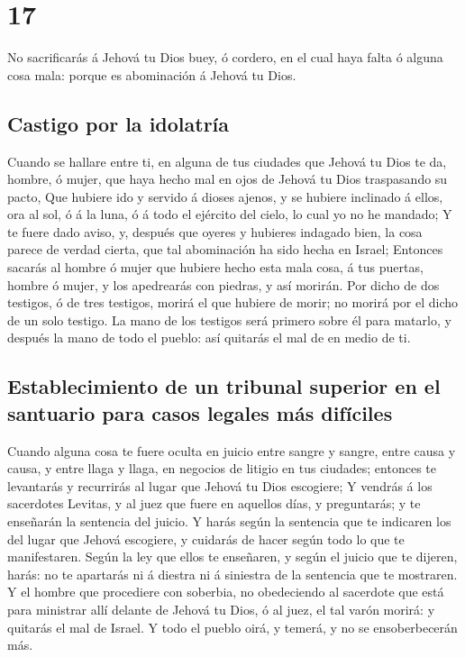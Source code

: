 \hypertarget{section-16}{%
\section{17}\label{section-16}}

 No sacrificarás á Jehová tu Dios buey, ó cordero, en el
cual haya falta ó alguna cosa mala: porque es abominación á Jehová tu
Dios.

\hypertarget{castigo-por-la-idolatruxeda}{%
\subsection{Castigo por la
idolatría}\label{castigo-por-la-idolatruxeda}}

 Cuando se hallare entre ti, en alguna de tus ciudades que
Jehová tu Dios te da, hombre, ó mujer, que haya hecho mal en ojos de
Jehová tu Dios traspasando su pacto,  Que hubiere ido y
servido á dioses ajenos, y se hubiere inclinado á ellos, ora al sol, ó á
la luna, ó á todo el ejército del cielo, lo cual yo no he mandado;
 Y te fuere dado aviso, y, después que oyeres y hubieres
indagado bien, la cosa parece de verdad cierta, que tal abominación ha
sido hecha en Israel;  Entonces sacarás al hombre ó mujer
que hubiere hecho esta mala cosa, á tus puertas, hombre ó mujer, y los
apedrearás con piedras, y así morirán.  Por dicho de dos
testigos, ó de tres testigos, morirá el que hubiere de morir; no morirá
por el dicho de un solo testigo.  La mano de los testigos
será primero sobre él para matarlo, y después la mano de todo el pueblo:
así quitarás el mal de en medio de ti.

\hypertarget{establecimiento-de-un-tribunal-superior-en-el-santuario-para-casos-legales-muxe1s-difuxedciles}{%
\subsection{Establecimiento de un tribunal superior en el santuario para
casos legales más
difíciles}\label{establecimiento-de-un-tribunal-superior-en-el-santuario-para-casos-legales-muxe1s-difuxedciles}}

 Cuando alguna cosa te fuere oculta en juicio entre sangre
y sangre, entre causa y causa, y entre llaga y llaga, en negocios de
litigio en tus ciudades; entonces te levantarás y recurrirás al lugar
que Jehová tu Dios escogiere;  Y vendrás á los sacerdotes
Levitas, y al juez que fuere en aquellos días, y preguntarás; y te
enseñarán la sentencia del juicio.  Y harás según la
sentencia que te indicaren los del lugar que Jehová escogiere, y
cuidarás de hacer según todo lo que te manifestaren. 
Según la ley que ellos te enseñaren, y según el juicio que te dijeren,
harás: no te apartarás ni á diestra ni á siniestra de la sentencia que
te mostraren.  Y el hombre que procediere con soberbia,
no obedeciendo al sacerdote que está para ministrar allí delante de
Jehová tu Dios, ó al juez, el tal varón morirá: y quitarás el mal de
Israel.  Y todo el pueblo oirá, y temerá, y no se
ensoberbecerán más.

